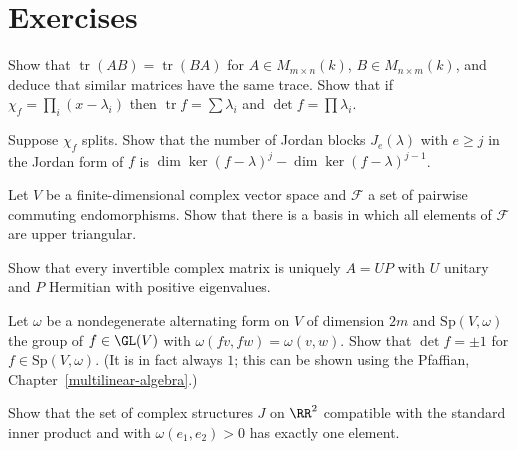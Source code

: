 \section{Exercises}\label{linear-algebra:section-exercises}

\begin{exercise}\label{linear-algebra:exercise-trace}
Show that $\operatorname{tr}(AB) = \operatorname{tr}(BA)$ for $A \in M_{m \times n}(k)$, $B \in M_{n \times m}(k)$, and deduce that similar
matrices have the same trace. Show that if $\chi_f = \prod_i (x - \lambda_i)$ then $\operatorname{tr} f = \sum \lambda_i$ and
$\det f = \prod \lambda_i$.
\end{exercise}

\begin{exercise}\label{linear-algebra:exercise-jordan-count}
Suppose $\chi_f$ splits. Show that the number of Jordan blocks $J_e(\lambda)$ with $e \geq j$ in the Jordan form of $f$
is $\dim\ker(f - \lambda)^j - \dim\ker(f - \lambda)^{j-1}$.
\end{exercise}

\begin{exercise}\label{linear-algebra:exercise-simultaneous-triangular}
Let $V$ be a finite-dimensional complex vector space and $\mathcal{F}$ a set of pairwise commuting endomorphisms.
Show that there is a basis in which all elements of $\mathcal{F}$ are upper triangular.
\end{exercise}

\begin{exercise}\label{linear-algebra:exercise-polar}
Show that every invertible complex matrix is uniquely $A = UP$ with $U$ unitary and $P$ Hermitian with positive
eigenvalues.
\end{exercise}

\begin{exercise}\label{linear-algebra:exercise-symplectic-determinant}
Let $\omega$ be a nondegenerate alternating form on $V$ of dimension $2m$ and $\mathrm{Sp}(V, \omega)$ the group of
$f \in \GL(V)$ with $\omega(fv, fw) = \omega(v, w)$. Show that $\det f = \pm 1$ for $f \in \mathrm{Sp}(V, \omega)$. (It is in fact
always $1$; this can be shown using the Pfaffian, Chapter~\ref{multilinear-algebra}.)
\end{exercise}

\begin{exercise}\label{linear-algebra:exercise-complex-structures-compatible}
Show that the set of complex structures $J$ on $\RR^{2}$ compatible with the standard inner product and with
$\omega(e_1, e_2) > 0$ has exactly one element.
\end{exercise}

